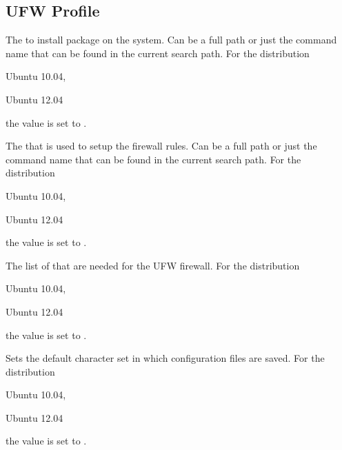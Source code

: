\label{sec:firewall_profile}
\subsection{UFW Profile}


The  to install package on the system. Can be a full path or
just the command name that can be found in the current search path. 
For the distribution
\begin{inparaitem}
\item[\TheDistribution{ubuntu}] Ubuntu 10.04,
\item[\TheDistribution{ubuntu}] Ubuntu 12.04
\end{inparaitem}
the value is set to .


The  that is used to setup the firewall rules. Can be a full path or
just the command name that can be found in the current search path. 
For the distribution
\begin{inparaitem}
\item[\TheDistribution{ubuntu}] Ubuntu 10.04,
\item[\TheDistribution{ubuntu}] Ubuntu 12.04
\end{inparaitem}
the value is set to .


The list of  that are needed for the UFW firewall. 
For the distribution
\begin{inparaitem}
\item[\TheDistribution{ubuntu}] Ubuntu 10.04,
\item[\TheDistribution{ubuntu}] Ubuntu 12.04
\end{inparaitem}
the value is set to .


Sets the default character set  in which configuration files are 
saved. For the distribution
\begin{inparaitem}
\item[\TheDistribution{ubuntu}] Ubuntu 10.04,
\item[\TheDistribution{ubuntu}] Ubuntu 12.04
\end{inparaitem}
the value is set to .
